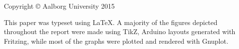 \thispagestyle{empty}
{\small
\strut\vfill
\noindent Copyright \copyright{} Aalborg University 2015\par
\vspace{0.2cm}
\noindent This paper was typeset using \LaTeX. A majority of the figures depicted throughout the report were made using TikZ, Arduino layouts generated with Fritzing, while most of the graphs were plotted and rendered with Gnuplot. 
}
\clearpage